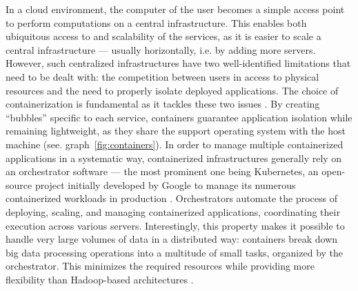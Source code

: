 \documentclass[graybox]{svmult}
\begin{document}
In a cloud environment, the computer of the user becomes a simple access point to perform computations on a central infrastructure. This enables both ubiquitous access to and scalability of the services, as it is easier to scale a central infrastructure — usually horizontally, i.e. by adding more servers. However, such centralized infrastructures have two well-identified limitations that need to be dealt with: the competition between users in access to physical resources and the need to properly isolate deployed applications. The choice of containerization is fundamental as it tackles these two issues \cite{bentaleb2022containerization}. By creating “bubbles” specific to each service, containers guarantee application isolation while remaining lightweight, as they share the support operating system with the host machine (see. graph~\ref{fig:containers}). In order to manage multiple containerized applications in a systematic way, containerized infrastructures generally rely on an orchestrator software — the most prominent one being Kubernetes, an open-source project initially developed by Google to manage its numerous containerized workloads in production \cite{vano2023cloud}. Orchestrators automate the process of deploying, scaling, and managing containerized applications, coordinating their execution across various servers. Interestingly, this property makes it possible to handle very large volumes of data in a distributed way: containers break down big data processing operations into a multitude of small tasks, organized by the orchestrator. This minimizes the required resources while providing more flexibility than Hadoop-based architectures \cite{zhang2018comparative}.
\end{document}
